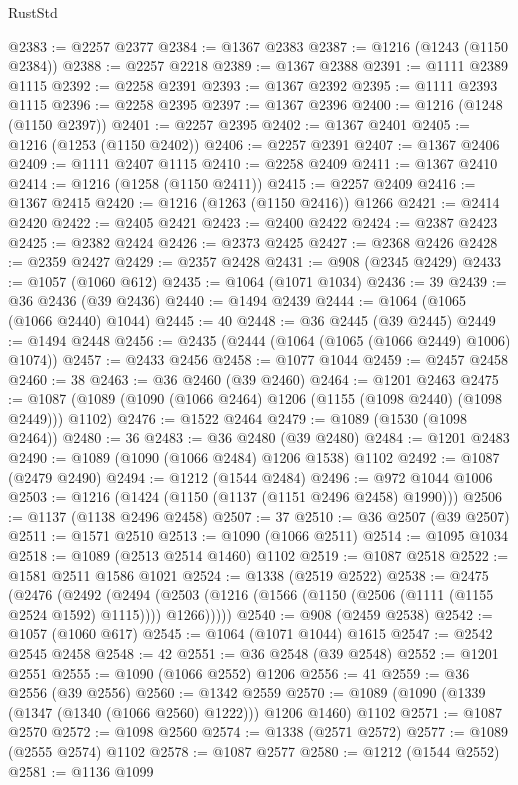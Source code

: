 \begin{lexlean}{RustStd}
\begin{coremodule}
{\begin{coremodule}
{{{{{{{{{{{{{{{{{{{{{{{{{{@2383 := @2257 @2377
@2384 := @1367 @2383
@2387 := @1216 (@1243 (@1150 @2384))
@2388 := @2257 @2218
@2389 := @1367 @2388
@2391 := @1111 @2389 @1115
@2392 := @2258 @2391
@2393 := @1367 @2392
@2395 := @1111 @2393 @1115
@2396 := @2258 @2395
@2397 := @1367 @2396
@2400 := @1216 (@1248 (@1150 @2397))
@2401 := @2257 @2395
@2402 := @1367 @2401
@2405 := @1216 (@1253 (@1150 @2402))
@2406 := @2257 @2391
@2407 := @1367 @2406
@2409 := @1111 @2407 @1115
@2410 := @2258 @2409
@2411 := @1367 @2410
@2414 := @1216 (@1258 (@1150 @2411))
@2415 := @2257 @2409
@2416 := @1367 @2415
@2420 := @1216 (@1263 (@1150 @2416)) @1266
@2421 := @2414 @2420
@2422 := @2405 @2421
@2423 := @2400 @2422
@2424 := @2387 @2423
@2425 := @2382 @2424
@2426 := @2373 @2425
@2427 := @2368 @2426
@2428 := @2359 @2427
@2429 := @2357 @2428
@2431 := @908 (@2345 @2429)
@2433 := @1057 (@1060 @612)
@2435 := @1064 (@1071 @1034)
@2436 := 39
@2439 := @36 @2436 (@39 @2436)
@2440 := @1494 @2439
@2444 := @1064 (@1065 (@1066 @2440) @1044)
@2445 := 40
@2448 := @36 @2445 (@39 @2445)
@2449 := @1494 @2448
@2456 := @2435 (@2444 (@1064 (@1065 (@1066 @2449) @1006) @1074))
@2457 := @2433 @2456
@2458 := @1077 @1044
@2459 := @2457 @2458
@2460 := 38
@2463 := @36 @2460 (@39 @2460)
@2464 := @1201 @2463
@2475 := @1087 (@1089 (@1090 (@1066 @2464) @1206 (@1155 (@1098 @2440) (@1098 @2449))) @1102)
@2476 := @1522 @2464
@2479 := @1089 (@1530 (@1098 @2464))
@2480 := 36
@2483 := @36 @2480 (@39 @2480)
@2484 := @1201 @2483
@2490 := @1089 (@1090 (@1066 @2484) @1206 @1538) @1102
@2492 := @1087 (@2479 @2490)
@2494 := @1212 (@1544 @2484)
@2496 := @972 @1044 @1006
@2503 := @1216 (@1424 (@1150 (@1137 (@1151 @2496 @2458) @1990)))
@2506 := @1137 (@1138 @2496 @2458)
@2507 := 37
@2510 := @36 @2507 (@39 @2507)
@2511 := @1571 @2510
@2513 := @1090 (@1066 @2511)
@2514 := @1095 @1034
@2518 := @1089 (@2513 @2514 @1460) @1102
@2519 := @1087 @2518
@2522 := @1581 @2511 @1586 @1021
@2524 := @1338 (@2519 @2522)
@2538 := @2475
    (@2476
      (@2492
        (@2494 (@2503 (@1216 (@1566 (@1150 (@2506 (@1111 (@1155 @2524 @1592) @1115)))) @1266)))))
@2540 := @908 (@2459 @2538)
@2542 := @1057 (@1060 @617)
@2545 := @1064 (@1071 @1044) @1615
@2547 := @2542 @2545 @2458
@2548 := 42
@2551 := @36 @2548 (@39 @2548)
@2552 := @1201 @2551
@2555 := @1090 (@1066 @2552) @1206
@2556 := 41
@2559 := @36 @2556 (@39 @2556)
@2560 := @1342 @2559
@2570 := @1089 (@1090 (@1339 (@1347 (@1340 (@1066 @2560) @1222))) @1206 @1460) @1102
@2571 := @1087 @2570
@2572 := @1098 @2560
@2574 := @1338 (@2571 @2572)
@2577 := @1089 (@2555 @2574) @1102
@2578 := @1087 @2577
@2580 := @1212 (@1544 @2552)
@2581 := @1136 @1099
}}}}}}}}}}}}}}}}}}}}}}}}}}
\end{coremodule}}
\end{coremodule}
\end{lexlean}
